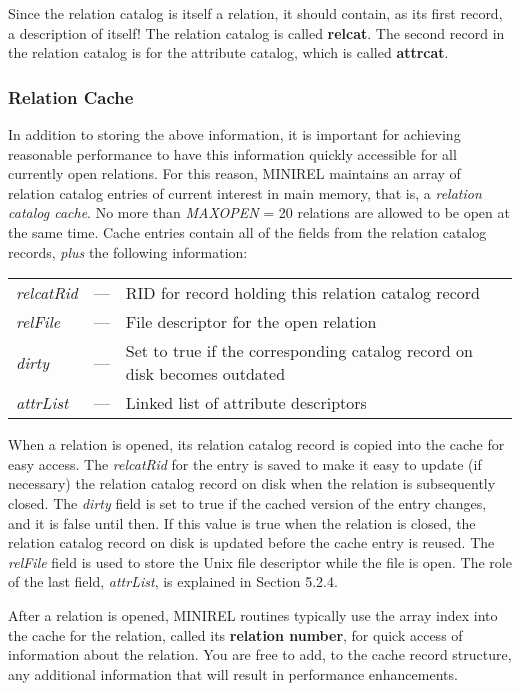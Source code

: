 \noindent
Since the relation catalog is itself a relation, it should contain, as its
first record, a description of itself!  The relation catalog 
is called {\bf relcat}.
The second record in the relation catalog is for the attribute catalog,
which is called {\bf attrcat}.

\subsubsection{Relation Cache}
In addition to storing the above information, it is important for
achieving reasonable performance to have this information quickly
accessible for all currently open relations.  For this reason, MINIREL
maintains an array of relation catalog entries of current interest in
main memory, that is, a \emph{relation catalog cache}.  
No more than \emph{MAXOPEN} = 20 relations are allowed to be open at the same
time.  Cache entries contain all of the fields from the relation
catalog records, \emph{plus} the following information:
\begin{center}
\begin{tabular}{l l l}
\emph{relcatRid} &---& RID for record holding this relation catalog record
\\
\emph{relFile} &---& File descriptor for the open relation
\\
\emph{dirty} &---& Set to true if the corresponding catalog record on disk
becomes outdated
\\
\emph{attrList} &---& Linked list of attribute descriptors 
\end{tabular}
\end{center}

\noindent
When a relation is opened, its relation catalog record is copied into
the cache for easy access.  The \emph{relcatRid} for the entry is
saved to make it easy to update (if necessary)
the relation catalog record on disk
when the relation is subsequently closed.  The \emph{dirty}
field is set to true if the cached version of the entry changes, and it
is false until then.  If this value is true when the relation is
closed, the relation catalog record on disk is updated before the cache entry
is reused.  The \emph{relFile} field is used to store the Unix file
descriptor while the file is open.  The role of the
last field, \emph{attrList}, is explained in Section 5.2.4.

After a relation is opened, MINIREL routines typically use the array
index into the cache for the relation, called its {\bf relation
number}, for quick access of information about the relation.  You are
free to add, to the cache record structure, any additional information
that will result in performance enhancements.

